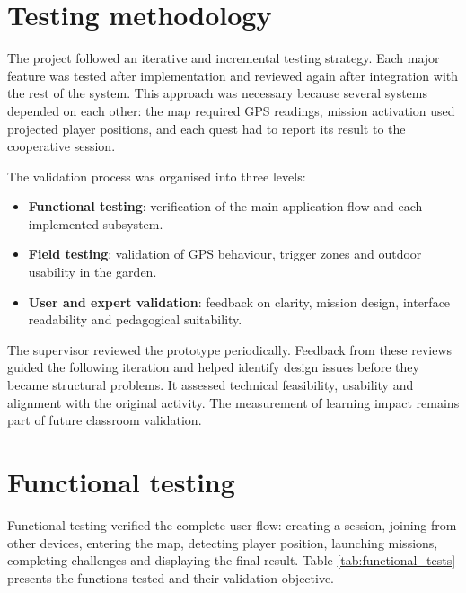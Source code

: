 
\section{Testing methodology}

The project followed an iterative and incremental testing strategy. Each major feature was tested after implementation and reviewed again after integration with the rest of the system. This approach was necessary because several systems depended on each other: the map required GPS readings, mission activation used projected player positions, and each quest had to report its result to the cooperative session.

The validation process was organised into three levels:

\begin{itemize}
    \item \textbf{Functional testing}: verification of the main application flow and each implemented subsystem.
    \item \textbf{Field testing}: validation of GPS behaviour, trigger zones and outdoor usability in the garden.
    \item \textbf{User and expert validation}: feedback on clarity, mission design, interface readability and pedagogical suitability.
\end{itemize}

The supervisor reviewed the prototype periodically. Feedback from these reviews guided the following iteration and helped identify design issues before they became structural problems. It assessed technical feasibility, usability and alignment with the original activity. The measurement of learning impact remains part of future classroom validation.

\section{Functional testing}

Functional testing verified the complete user flow: creating a session, joining from other devices, entering the map, detecting player position, launching missions, completing challenges and displaying the final result. Table \ref{tab:functional_tests} presents the functions tested and their validation objective.

